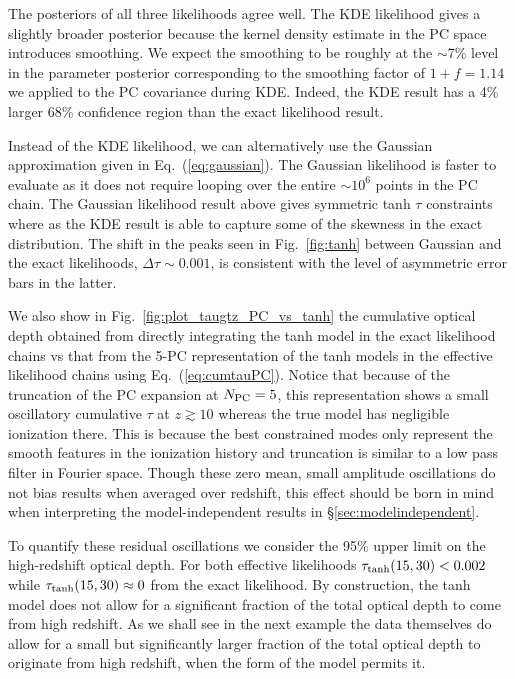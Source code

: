 \documentclass[aps,prd,twocolumn,amsmath,amssymb,showpacs,floatfix,superscriptaddress,nofootinbib]{revtex4-1}
\begin{document}
The posteriors of all three likelihoods agree well. The KDE likelihood gives a slightly broader posterior because the kernel density estimate in the PC space introduces smoothing. We expect the smoothing to be roughly at the $\sim$7\% level in the parameter posterior corresponding to the smoothing factor of $1+f = 1.14$ we applied to the PC covariance during KDE. Indeed, the KDE result has a 4\% larger 68\% confidence region than the exact likelihood result. 

Instead of the KDE likelihood, we can alternatively use the Gaussian approximation given in Eq.~(\ref{eq:gaussian}). The Gaussian likelihood is faster to evaluate as it does not require looping over the entire $\sim 10^6$ points in the PC chain. 
The Gaussian likelihood result above gives symmetric tanh $\tau$ constraints where as the KDE result is able to capture some of the skewness in the exact distribution. The shift in the peaks seen in Fig.~\ref{fig:tanh} between Gaussian and the exact likelihoods, $\Delta \tau \sim 0.001$, is consistent with the level of asymmetric error bars in the latter. 

We also show in Fig.~\ref{fig:plot_taugtz_PC_vs_tanh} the cumulative optical depth obtained from directly integrating the tanh model in the exact likelihood chains vs that from the 5-PC representation of the tanh models in the effective likelihood chains using Eq.~(\ref{eq:cumtauPC}).
Notice that because of the truncation of the PC expansion at $N_{\rm PC}=5$,
this representation shows a small oscillatory cumulative $\tau$ at $z \gtrsim 10$ whereas the true model has negligible ionization there.   This is because the best constrained modes only represent the smooth features in the ionization history and truncation is similar to a low pass filter in Fourier space.  Though these zero mean, small amplitude oscillations do not bias results when averaged over redshift, this effect should be born in mind when interpreting the model-independent results in \S\ref{sec:modelindependent}.  

To quantify these residual oscillations we consider 
the 95\% upper limit on the high-redshift optical depth.
For both effective likelihoods  $\tau_{\rm tanh}(15, 30) < 0.002$  while $\tau_{\rm tanh}(15,30) \approx 0$
from the exact likelihood. 
By construction, the tanh model does not allow for a significant fraction of the total optical depth to come from high redshift.  As we shall see in the next example the data themselves do allow for a small but significantly larger fraction of the total optical depth to originate from high redshift, when the form of the model permits it.
\end{document}

